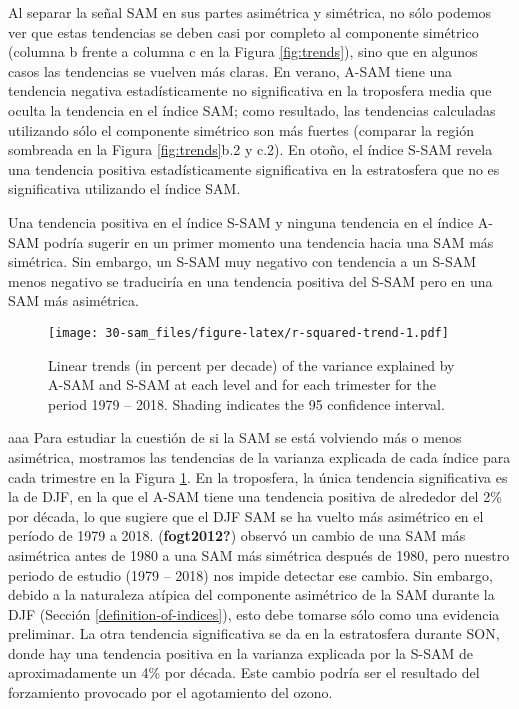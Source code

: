 \documentclass[12pt,oneside]{reedthesis}
\begin{document}
Al separar la señal SAM en sus partes asimétrica y simétrica, no sólo podemos ver que estas tendencias se deben casi por completo al componente simétrico (columna b frente a columna c en la Figura \ref{fig:trends}), sino que en algunos casos las tendencias se vuelven más claras.
En verano, A\nobreakdash-SAM tiene una tendencia negativa estadísticamente no significativa en la troposfera media que oculta la tendencia en el índice SAM; como resultado, las tendencias calculadas utilizando sólo el componente simétrico son más fuertes (comparar la región sombreada en la Figura \ref{fig:trends}b.2 y c.2).
En otoño, el índice S\nobreakdash-SAM revela una tendencia positiva estadísticamente significativa en la estratosfera que no es significativa utilizando el índice SAM.

Una tendencia positiva en el índice S\nobreakdash-SAM y ninguna tendencia en el índice A\nobreakdash-SAM podría sugerir en un primer momento una tendencia hacia una SAM más simétrica.
Sin embargo, un S\nobreakdash-SAM muy negativo con tendencia a un S\nobreakdash-SAM menos negativo se traduciría en una tendencia positiva del S\nobreakdash-SAM pero en una SAM más asimétrica.
\begin{figure}
\centering
\texttt{[image: 30-sam\_files/figure-latex/r-squared-trend-1.pdf]}
\caption{\label{fig:r-squared-trend}Linear trends (in percent per decade) of the variance explained by A-SAM and S-SAM at each level and for each trimester for the period 1979 -- 2018. Shading indicates the 95 confidence interval.}
\end{figure}
aaa
Para estudiar la cuestión de si la SAM se está volviendo más o menos asimétrica, mostramos las tendencias de la varianza explicada de cada índice para cada trimestre en la Figura \ref{fig:r-squared-trend}.
En la troposfera, la única tendencia significativa es la de DJF, en la que el A\nobreakdash-SAM tiene una tendencia positiva de alrededor del 2\% por década, lo que sugiere que el DJF SAM se ha vuelto más asimétrico en el período de 1979 a 2018.
(\textbf{fogt2012?}) observó un cambio de una SAM más asimétrica antes de 1980 a una SAM más simétrica después de 1980, pero nuestro periodo de estudio (1979 -- 2018) nos impide detectar ese cambio.
Sin embargo, debido a la naturaleza atípica del componente asimétrico de la SAM durante la DJF (Sección \ref{definition-of-indices}), esto debe tomarse sólo como una evidencia preliminar.
La otra tendencia significativa se da en la estratosfera durante SON, donde hay una tendencia positiva en la varianza explicada por la S\nobreakdash-SAM de aproximadamente un 4\% por década.
Este cambio podría ser el resultado del forzamiento provocado por el agotamiento del ozono.
\end{document}
